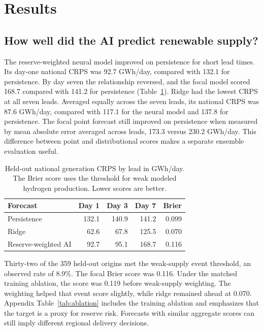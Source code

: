 \section{Results}
\label{sec:results}

\subsection{How well did the AI predict renewable supply?}
The reserve-weighted neural model improved on persistence for short lead times. Its day-one national CRPS was 92.7 GWh/day, compared with 132.1 for persistence. By day seven the relationship reversed, and the focal model scored 168.7 compared with 141.2 for persistence (Table~\ref{tab:forecasts}). Ridge had the lowest CRPS at all seven leads. Averaged equally across the seven leads, its national CRPS was 87.6 GWh/day, compared with 117.1 for the neural model and 137.8 for persistence. The focal point forecast still improved on persistence when measured by mean absolute error averaged across leads, 173.3 versus 230.2 GWh/day. This difference between point and distributional scores makes a separate ensemble evaluation useful.

\begin{table}[t]
\centering\small
\caption{Held-out national generation CRPS by lead in GWh/day. The Brier score uses the threshold for weak modeled hydrogen production. Lower scores are better.}
\label{tab:forecasts}
\begin{tabular}{@{}lrrrr@{}}
\toprule
Forecast & Day 1 & Day 3 & Day 7 & Brier \\
\midrule
Persistence & 132.1 & 140.9 & 141.2 & 0.099 \\
Ridge & 62.6 & 67.8 & 125.5 & 0.070 \\
Reserve-weighted AI & 92.7 & 95.1 & 168.7 & 0.116 \\
\bottomrule
\end{tabular}
\end{table}

Thirty-two of the 359 held-out origins met the weak-supply event threshold, an observed rate of 8.9\%. The focal Brier score was 0.116. Under the matched training ablation, the score was 0.119 before weak-supply weighting. The weighting helped that event score slightly, while ridge remained ahead at 0.070. Appendix Table~\ref{tab:ablation} includes the training ablation and emphasizes that the target is a proxy for reserve risk. Forecasts with similar aggregate scores can still imply different regional delivery decisions.

